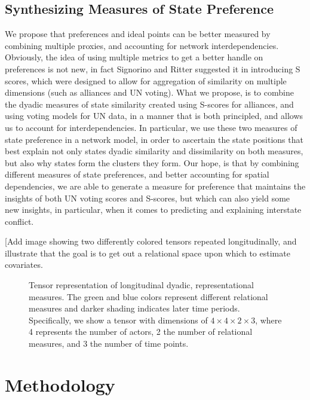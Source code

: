 \subsection{Synthesizing Measures of State Preference}

We propose that preferences and ideal points can be better measured by combining multiple proxies, and accounting for network interdependencies. Obviously, the idea of using multiple metrics to get a better handle on preferences is not new, in fact Signorino and Ritter suggested it in introducing S scores, which were designed to allow for aggregation of similarity on multiple dimensions (such as alliances and UN voting). What we propose, is to combine the dyadic measures of state similarity created using S-scores for alliances, and using voting models for UN data, in a manner that is both principled, and allows us to account for interdependencies. In particular, we use these two measures of state preference in a network model, in order to ascertain the state positions that best explain not only states dyadic similarity and dissimilarity on both measures, but also why states form the clusters they form. Our hope, is that by combining different measures of state preferences, and better accounting for spatial dependencies, we are able to generate a measure for preference that maintains the insights of both UN voting scores and S-scores, but which can also yield some new insights, in particular, when it comes to predicting and explaining interstate conflict.

[Add image showing two differently colored tensors repeated longitudinally, and illustrate that the goal is to get out a relational space upon which to estimate covariates. 

\begin{figure}[ht]
	\centering
	\resizebox{.5\textwidth}{!}{}
	\caption{Tensor representation of longitudinal dyadic, representational measures. The green and blue colors represent different relational measures and darker shading indicates later time periods. Specifically, we show a tensor with dimensions of $4 \times 4 \times 2 \times 3$, where 4 represents the number of actors, 2 the number of relational measures, and 3 the number of time points.}
	\label{fig:tensViz}
\end{figure}

\section{Methodology}

